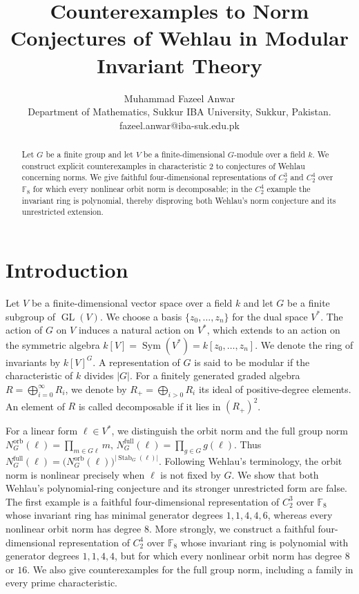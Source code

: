 \documentclass[11pt]{article}
\title{Counterexamples to Norm Conjectures of Wehlau in Modular Invariant Theory}
\author{Muhammad Fazeel Anwar\\
	\small Department of Mathematics, Sukkur IBA University, Sukkur, Pakistan. \\ fazeel.anwar@iba-suk.edu.pk}
\theoremstyle{definition}
\newcommand{\Sym}{\operatorname{Sym}}
\newcommand{\GL}{\operatorname{GL}}
\begin{document}
\maketitle

\begin{abstract}
	Let $G$ be a finite group and let $V$ be a finite-dimensional $G$-module over a field $k$. We construct explicit counterexamples in characteristic $2$ to conjectures of Wehlau concerning norms. We give faithful four-dimensional representations of $C_2^3$ and $C_2^4$ over $\mathbb F_8$ for which every nonlinear orbit norm is decomposable; in the $C_2^4$ example the invariant ring is polynomial, thereby disproving both Wehlau's norm conjecture and its unrestricted extension. 
	
\end{abstract}

\section{Introduction}
	Let $V$ be a finite-dimensional vector space over a field $k$ and let $G$ be a finite subgroup of $\GL(V)$. We choose a basis $\{z_0,\ldots,z_n\}$ for the dual space $V^*$. The action of $G$ on $V$ induces a natural action on $V^*$, which extends to an action on the symmetric algebra $k[V]=\Sym(V^*)=k[z_0,\ldots,z_n]$. We denote the ring of invariants by $k[V]^G$. A representation of $G$ is said to be modular if the characteristic of $k$ divides $|G|$. For a finitely generated graded algebra $R=\bigoplus_{i=0}^{\infty}R_i$, we denote by $R_{+}=\bigoplus_{i>0}R_i$ its ideal of positive-degree elements. An element of $R$ is called decomposable if it lies in $(R_{+})^2$.

	For a linear form $\ell\in V^*$, we distinguish the orbit norm and the full group norm $N_G^{\mathrm{orb}}(\ell)=\prod_{m\in G\ell}m, \, N_G^{\mathrm{full}}(\ell)=\prod_{g\in G}g(\ell)$. Thus $N_G^{\mathrm{full}}(\ell)=\bigl(N_G^{\mathrm{orb}}(\ell)\bigr)^{|\operatorname{Stab}_G(\ell)|}$. Following Wehlau's terminology, the orbit norm is nonlinear precisely when $\ell$ is not fixed by $G$. We show that both Wehlau's polynomial-ring conjecture and its stronger unrestricted form are false. The first example is a faithful four-dimensional representation of $C_2^3$ over $\mathbb F_8$ whose invariant ring has minimal generator degrees $1,1,4,4,6$, whereas every nonlinear orbit norm has degree $8$. More strongly, we construct a faithful four-dimensional representation of $C_2^4$ over $\mathbb F_8$ whose invariant ring is polynomial with generator degrees $1,1,4,4$, but for which every nonlinear orbit norm has degree $8$ or $16$. We also give counterexamples for the full group norm, including a family in every prime characteristic.
\end{document}
